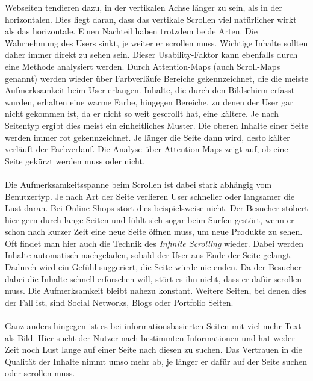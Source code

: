 Webseiten tendieren dazu, in der vertikalen Achse länger zu sein, als in der horizontalen. Dies liegt daran, dass das vertikale Scrollen viel natürlicher wirkt als das horizontale. Einen Nachteil haben trotzdem beide Arten. Die Wahrnehmung des Users sinkt, je weiter er scrollen muss. Wichtige Inhalte sollten daher immer direkt zu sehen sein. Dieser Usability-Faktor kann ebenfalls durch eine Methode analysiert werden. Durch Attention-Maps (auch Scroll-Maps genannt) werden wieder über Farbverläufe Bereiche gekennzeichnet, die die meiste Aufmerksamkeit beim User erlangen. Inhalte, die durch den Bildschirm erfasst wurden, erhalten eine warme Farbe, hingegen Bereiche, zu denen der User gar nicht gekommen ist, da er nicht so weit gescrollt hat, eine kältere. Je nach Seitentyp ergibt dies meist ein einheitliches Muster. Die oberen Inhalte einer Seite werden immer rot gekennzeichnet. Je länger die Seite dann wird, desto kälter verläuft der Farbverlauf. Die Analyse über Attention Maps zeigt auf, ob eine Seite gekürzt werden muss oder nicht.\\
\\
Die Aufmerksamkeitsspanne beim Scrollen ist dabei stark abhängig vom Benutzertyp. Je nach Art der Seite verlieren User schneller oder langsamer die Lust daran. Bei Online-Shops stört dies beispielsweise nicht. Der Besucher stöbert hier gern durch lange Seiten und fühlt sich sogar beim Surfen gestört, wenn er schon nach kurzer Zeit eine neue Seite öffnen muss, um neue Produkte zu sehen. Oft findet man hier auch die Technik des \textit{Infinite Scrolling} wieder. Dabei werden Inhalte automatisch nachgeladen, sobald der User ans Ende der Seite gelangt. Dadurch wird ein Gefühl suggeriert, die Seite würde nie enden. Da der Besucher dabei die Inhalte schnell erforschen will, stört es ihn nicht, dass er dafür scrollen muss. Die Aufmerksamkeit bleibt nahezu konstant. Weitere Seiten, bei denen dies der Fall ist, sind Social Networks, Blogs oder Portfolio Seiten.\\
\\
Ganz anders hingegen ist es bei informationsbasierten Seiten mit viel mehr Text als Bild. Hier sucht der Nutzer nach bestimmten Informationen und hat weder Zeit noch Lust lange auf einer Seite nach diesen zu suchen. Das Vertrauen in die Qualität der Inhalte nimmt umso mehr ab, je länger er dafür auf der Seite suchen oder scrollen muss.